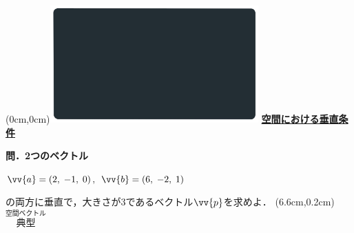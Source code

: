 \documentclass[10pt,
fleqn,
dvipdfmx,
uplatex
]{jsarticle}
\begin{document}
\at(0cm,0cm){\includegraphics[width=8cm,bb=0 0 1920 1080]{./media_local/smart_background/空間ベクトル.jpeg}}
{\color{orange}\bf\boldmath\LARGE\underline{空間における垂直条件}}\vspace{0.3zw}

\Large 
\bf\boldmath 問．2つのベクトル

\large
\vspace{0.3zw}
\hspace{0.3zw}$\vv{a}=\left(2,\;-1,\;0\right),\;$$\vv{b}=\left(6,\;-2,\;1\right)$
\vspace{0.3zw}

\Large 
の両方に垂直で，大きさが$3$であるベクトル$\vv{p}$を求めよ．
\at(6.6cm,0.2cm){\small\color{bradorange}$\overset{\text{空間ベクトル}}{\text{典型}}$}
\end{document}

